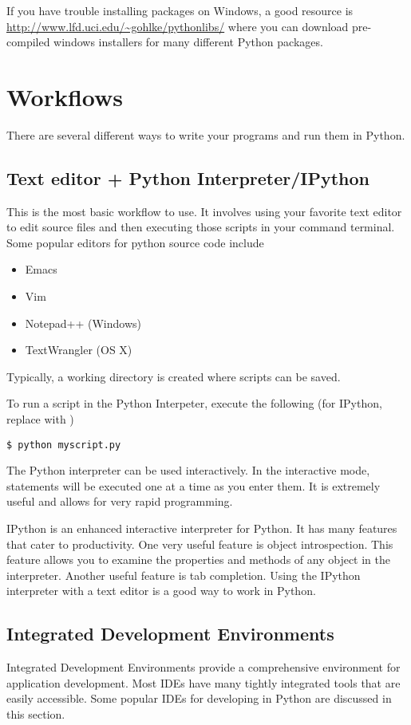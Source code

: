 If you have trouble installing packages on Windows, a good resource is
\url{http://www.lfd.uci.edu/~gohlke/pythonlibs/} where you can download pre-compiled
windows installers for many different Python packages.

\section*{Workflows}
There are several different ways to write your programs and run them in Python.

\subsection*{Text editor + Python Interpreter/IPython}
This is the most basic workflow to use.
It involves using your favorite text editor to edit source files and then executing
those scripts in your command terminal.
Some popular editors for python source code include
\begin{itemize}
\item Emacs
\item Vim
\item Notepad++ (Windows)
\item TextWrangler (OS X)
\end{itemize}
Typically, a working directory is created where scripts can be saved.

To run a script in the Python Interpeter, execute the following (for IPython, replace
 with )
\begin{verbatim}
$ python myscript.py
\end{verbatim}
The Python interpreter can be used interactively.
In the interactive mode, statements will be executed one at a time as you enter them.
It is extremely useful and allows for very rapid programming.

IPython is an enhanced interactive interpreter for Python.
It has many features that cater to productivity.
One very useful feature is object introspection.
This feature allows you to examine the properties and methods of any object in the
interpreter.
Another useful feature is tab completion.
Using the IPython interpreter with a text editor is a good way to work in Python.

\subsection*{Integrated Development Environments}
Integrated Development Environments provide a comprehensive environment for
application development.
Most IDEs have many tightly integrated tools that are easily accessible.
Some popular IDEs for developing in Python are discussed in this section.

